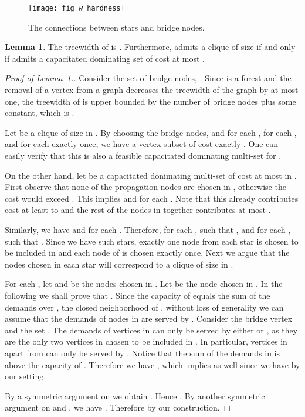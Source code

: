 \documentclass[a4paper,11pt]{article}
\theoremstyle{definition}
\newtheorem{lemma}[theorem]{Lemma}
\begin{document}
\begin{figure}[h]
\centering
\caption{The connections between stars and bridge nodes.}
\texttt{[image: fig\_w\_hardness]}
\end{figure}

\begin{lemma} \label{lemma_w_1_hardness}
The treewidth of  is . Furthermore,  admits a clique of size  if and only if  admits a capacitated dominating set of cost at most .
\end{lemma}

\begin{proof}[Proof of Lemma~\ref{lemma_w_1_hardness}.]
Consider the set of bridge nodes, . Since  is a forest and the removal of a vertex from a graph decreases the treewidth of the graph by at most one, the treewidth of  is upper bounded by the number of bridge nodes plus some constant, which is .

Let  be a clique of size  in . By choosing the bridge nodes,  and  for each ,  for each , and  for each  exactly once, we have a vertex subset of cost exactly . One can easily verify that this is also a feasible capacitated dominating multi-set for .

On the other hand, let  be a capacitated donimating multi-set of cost at most  in . First observe that none of the propagation nodes are chosen in , otherwise the cost would exceed . This implies  and  for each . Note that this already contributes cost at least  to  and the rest of the nodes in  together contributes at most . 

Similarly, we have  and  for each . Therefore, for each ,  such that , and for each ,  such that . Since we have  such stars, exactly one node from each star is chosen to be included in  and each node of  is chosen exactly once. Next we argue that the nodes chosen in each star will correspond to a clique of size  in .

For each , let  and  be the nodes chosen in . Let  be the node chosen in . In the following we shall prove that . Since the capacity of  equals the sum of the demands over , the closed neighborhood of , without loss of generality we can assume that the demands of nodes in  are served by . Consider the bridge vertex  and the set . The demands of vertices in  can only be served by either  or , as they are the only two vertices in  chosen to be included in . In particular, vertices in  apart from  can only be served by . Notice that the sum of the demands in  is  above the capacity of . Therefore we have , which implies  as well since we have  by our setting.

By a symmetric argument on  we obtain . Hence . By another symmetric argument on  and , we have . Therefore  by our construction.
\end{proof}
\end{document}
